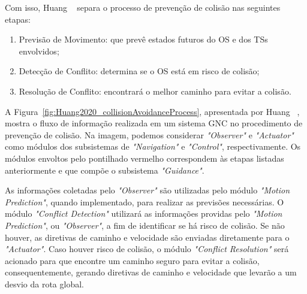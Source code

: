        Com isso, Huang \etal~\cite{HUANG2020451} separa o processo de prevenção de colisão nas seguintes etapas: 
        
        \begin{enumerate}
            \item Previsão de Movimento: que prevê estados futuros do OS e dos TSs envolvidos;
            \item Detecção de Conflito: determina se o OS está em risco de colisão;
            \item Resolução de Conflito: encontrará o melhor caminho para evitar a colisão.
        \end{enumerate}
        
        A Figura~\ref{fig:Huang2020_collisionAvoidanceProcess}, apresentada por Huang \etal~\cite{HUANG2020451}, mostra o fluxo de informação realizada em um sistema GNC no procedimento de prevenção de colisão. Na imagem, podemos considerar \textit{"Observer"} e \textit{"Actuator"} como módulos dos subsistemas de \textit{"Navigation"} e \textit{"Control"}, respectivamente. Os módulos envoltos pelo pontilhado vermelho correspondem às etapas listadas anteriormente e que compõe o subsistema \textit{"Guidance"}.
        
        As informações coletadas pelo \textit{"Observer"} são utilizadas pelo módulo \textit{"Motion Prediction"}, quando implementado, para realizar as previsões necessárias. O módulo \textit{"Conflict Detection"} utilizará as informações providas pelo \textit{"Motion Prediction"}, ou \textit{"Observer"}, a fim de identificar se há risco de colisão. Se não houver, as diretivas de caminho e velocidade são enviadas diretamente para o \textit{"Actuator"}. Caso houver risco de colisão, o módulo \textit{"Conflict Resolution"} será acionado para que encontre um caminho seguro para evitar a colisão, consequentemente, gerando diretivas de caminho e velocidade que levarão a um desvio da rota global.
        
